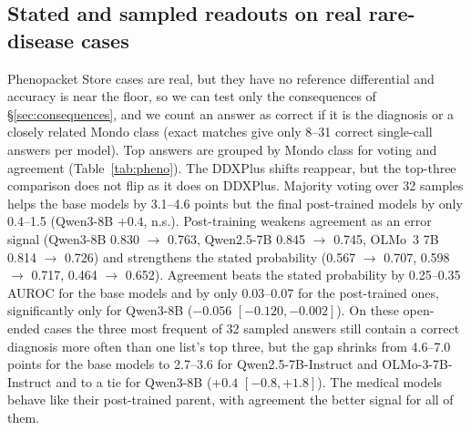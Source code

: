 \documentclass[11pt]{article}
\begin{document}
\subsection{Stated and sampled readouts on real rare-disease cases}\label{sec:phenoreadouts}
Phenopacket Store cases are real, but they have no reference differential and accuracy is near the floor, so we can test only the consequences of \S\ref{sec:consequences}, and we count an answer as correct if it is the diagnosis or a closely related Mondo class (exact matches give only 8--31 correct single-call answers per model). Top answers are grouped by Mondo class for voting and agreement (Table~\ref{tab:pheno}).
The DDXPlus shifts reappear, but the top-three comparison does not flip as it does on DDXPlus. Majority voting over 32 samples helps the base models by 3.1--4.6 points but the final post-trained models by only 0.4--1.5 (Qwen3-8B $+0.4$, n.s.). Post-training weakens agreement as an error signal (Qwen3-8B 0.830 $\rightarrow$ 0.763, Qwen2.5-7B 0.845 $\rightarrow$ 0.745, OLMo~3 7B 0.814 $\rightarrow$ 0.726) and strengthens the stated probability (0.567 $\rightarrow$ 0.707, 0.598 $\rightarrow$ 0.717, 0.464 $\rightarrow$ 0.652). Agreement beats the stated probability by 0.25--0.35 AUROC for the base models and by only 0.03--0.07 for the post-trained ones, significantly only for Qwen3-8B ($-0.056$ $[-0.120,-0.002]$). On these open-ended cases the three most frequent of 32 sampled answers still contain a correct diagnosis more often than one list's top three, but the gap shrinks from 4.6--7.0 points for the base models to 2.7--3.6 for Qwen2.5-7B-Instruct and OLMo-3-7B-Instruct and to a tie for Qwen3-8B ($+0.4$ $[-0.8,+1.8]$). The medical models behave like their post-trained parent, with agreement the better signal for all of them.
\end{document}
